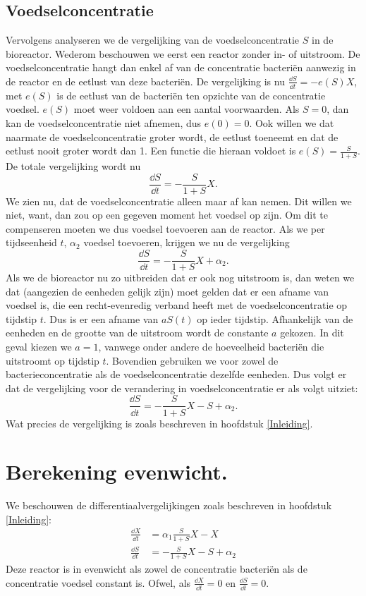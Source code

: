 \subsection*{Voedselconcentratie}
Vervolgens analyseren we de vergelijking van de voedselconcentratie $S$ in de bioreactor. Wederom beschouwen we eerst een reactor zonder in- of uitstroom. De voedselconcentratie hangt dan enkel af van de concentratie bacteri\"en aanwezig in de reactor en de eetlust van deze bacteri\"en. De vergelijking is nu $\tfrac{\dd S}{\dd t} = -e(S)X$, met $e(S)$ is de eetlust van de bacteri\"en ten opzichte van de concentratie voedsel. $e(S)$ moet weer voldoen aan een aantal voorwaarden. Als $S = 0$, dan kan de voedselconcentratie niet afnemen, dus $e(0)=0$. Ook willen we dat naarmate de voedselconcentratie groter wordt, de eetlust toeneemt en dat de eetlust nooit groter wordt dan 1. Een functie die hieraan voldoet is $e(S) = \frac{S}{1+S}$. De totale vergelijking wordt nu
\[ 
	\frac{\dd S}{\dd t}=-\frac{S}{1+S}X.
\]
We zien nu, dat de voedselconcentratie alleen maar af kan nemen. Dit willen we niet, want, dan zou op een gegeven moment het voedsel op zijn. Om dit te compenseren moeten we dus voedsel toevoeren aan de reactor. Als we per tijdseenheid $t$, $\alpha_2$ voedsel toevoeren, krijgen we nu de vergelijking
\[ 
	\frac{\dd S}{\dd t}=-\frac{S}{1+S}X + \alpha_2.
\]
Als we de bioreactor nu zo uitbreiden dat er ook nog uitstroom is, dan weten we dat (aangezien de eenheden gelijk zijn) moet gelden dat er een afname van voedsel is, die een recht-evenredig verband heeft met de voedselconcentratie op tijdstip $t$. Dus is er een afname van $a S(t)$ op ieder tijdstip. Afhankelijk van de eenheden en de grootte van de uitstroom wordt de constante $a$ gekozen. In dit geval kiezen we $a = 1$, vanwege onder andere de hoeveelheid bacteri\"en die uitstroomt op tijdstip $t$. Bovendien gebruiken we voor zowel de bacterieconcentratie als de voedselconcentratie dezelfde eenheden. Dus volgt er dat de vergelijking voor de verandering in voedselconcentratie er als volgt uitziet:
\begin{equation}
	\frac{\dd S}{\dd t} = -\frac{S}{1 + S} X - S + \alpha_2.
\end{equation}
Wat precies de vergelijking is zoals beschreven in hoofdstuk \ref{Inleiding}.

\section{Berekening evenwicht.}
We beschouwen de differentiaalvergelijkingen zoals beschreven in hoofdstuk \ref{Inleiding}:  
\begin{align}
	\frac{\dd X}{\dd t} &= \alpha_1 \frac{S}{1 + S} X - X 			\label{eq:be1}	\\
	\frac{\dd S}{\dd t} &= - \frac{S}{1 + S}X - S + \alpha_2 		\label{eq:be2}
\end{align}
Deze reactor is in evenwicht als zowel de concentratie bacteri\"en als de concentratie voedsel constant is. Ofwel, als $\frac{\dd X}{\dd t} = 0$ en $\frac{\dd S}{\dd t} = 0$.

